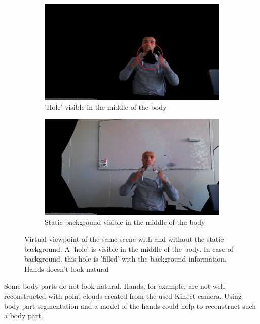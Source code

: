 \begin{figure}[H]
\centering
  \begin{subfigure}[b]{0.48 \textwidth}
    \includegraphics[width=\textwidth]{images/general_result/00492_hole_red.jpg}
    \caption{'Hole' visible in the middle of the body}
    \label{figure:00492_hole_red}
  \end{subfigure}
  \hfill
  \begin{subfigure}[b]{0.48 \textwidth}
    \includegraphics[width=\textwidth]{images/general_result/00492_background_hole.jpg}
    \caption{Static background visible in the middle of the body}
    \label{figure:00492_background_hole}
  \end{subfigure}
  \caption{Virtual viewpoint of the same scene with and without the static background. A 'hole' is visible in the middle of the body. In case of background, this hole is 'filled' with the background information. Hands doesn't look natural}
  \label{figure:00492_hole_red_background}
\end{figure}

Some body-parts do not look natural. Hands, for example, are not well reconstructed with point clouds created from the used Kinect camera. Using body part segmentation and a model of the hands could help to reconstruct such a body part.

